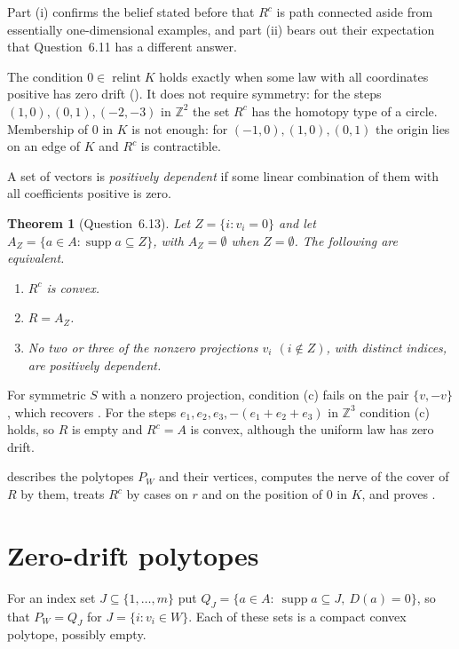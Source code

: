 \documentclass[11pt]{article}
\newtheorem{theorem}{Theorem}[section]
\theoremstyle{remark}
\DeclareMathOperator{\supp}{supp}
\DeclareMathOperator{\relint}{relint}
\newcommand{\Z}{\mathbb{Z}}
\begin{document}
Part (i) confirms the belief stated before \cite[Question~6.8]{LMW} that $R^c$ is path connected aside from essentially
one-dimensional examples, and part (ii) bears out their expectation that Question~6.11 has a different
answer.

The condition $0\in\relint K$ holds exactly when some law with all coordinates positive has zero drift
(). It does not require symmetry: for the steps $(1,0),(0,1),(-2,-3)$ in $\Z^2$ the set $R^c$ has the
homotopy type of a circle. Membership of $0$ in $K$ is not enough: for $(-1,0),(1,0),(0,1)$ the origin lies on an edge
of $K$ and $R^c$ is contractible.

A set of vectors is \emph{positively dependent} if some linear combination of them with all coefficients positive
is zero.

\begin{theorem}[Question~6.13]\label{thm:convex}
Let $Z=\{i:v_i=0\}$ and let $A_Z=\{a\in A:\supp a\subseteq Z\}$, with $A_Z=\emptyset$ when $Z=\emptyset$. The following
are equivalent.
\begin{enumerate}[label=\textup{(\alph*)},nosep]
\item $R^c$ is convex.
\item $R=A_Z$.
\item No two or three of the nonzero projections $v_i$ $(i\notin Z)$, with distinct indices, are positively
dependent.
\end{enumerate}
\end{theorem}

For symmetric $S$ with a nonzero projection, condition (c) fails on the pair $\{v,-v\}$, which recovers
\cite[Proposition~6.12]{LMW}. For the steps $e_1,e_2,e_3,-(e_1+e_2+e_3)$ in $\Z^3$ condition (c) holds, so $R$ is empty
and $R^c=A$ is convex, although the uniform law has zero drift.

 describes the polytopes $P_W$ and their vertices,  computes the nerve of the cover
of $R$ by them,  treats $R^c$ by cases on $r$ and on the position of $0$ in $K$, and
 proves .

\section{Zero-drift polytopes}\label{sec:polytopes}

For an index set $J\subseteq\{1,\dots,m\}$ put $Q_J=\{a\in A:\ \supp a\subseteq J,\ D(a)=0\}$, so that
$P_W=Q_J$ for $J=\{i:v_i\in W\}$. Each of these sets is a compact convex polytope, possibly empty.
\end{document}
